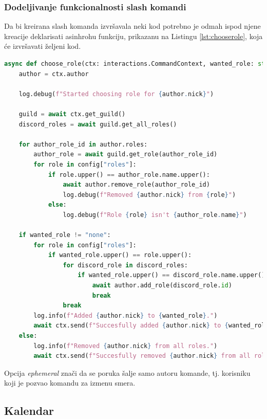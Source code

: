 \documentclass[a4paper,11pt]{article}
\begin{document}
\subsubsection{Dodeljivanje funkcionalnosti slash komandi}
Da bi kreirana slash komanda izvršavala neki kod potrebno je odmah ispod njene kreacije deklarisati asinhrohu funkciju, prikazanu na Listingu \ref{lst:chooserole}, koja će izvršavati željeni kod.
\begin{lstlisting}[language=Python, caption=Dodeljivanje funkcionalnosti slash komandi, label=lst:chooserole]
async def choose_role(ctx: interactions.CommandContext, wanted_role: str):
    author = ctx.author

    log.debug(f"Started choosing role for {author.nick}")

    guild = await ctx.get_guild()
    discord_roles = await guild.get_all_roles()

    for author_role_id in author.roles:
        author_role = await guild.get_role(author_role_id)
        for role in config["roles"]:
            if role.upper() == author_role.name.upper():
                await author.remove_role(author_role_id)
                log.debug(f"Removed {author.nick} from {role}")
            else:
                log.debug(f"Role {role} isn't {author_role.name}")
    
    if wanted_role != "none":
        for role in config["roles"]:
            if wanted_role.upper() == role.upper():
                for discord_role in discord_roles:
                    if wanted_role.upper() == discord_role.name.upper():
                        await author.add_role(discord_role.id)
                        break
                break
        log.info(f"Added {author.nick} to {wanted_role}.")
        await ctx.send(f"Succesfully added {author.nick} to {wanted_role.upper()}!", ephemeral=True)
    else:
        log.info(f"Removed {author.nick} from all roles.")
        await ctx.send(f"Succesfully removed {author.nick} from all roles!", ephemeral=True)
\end{lstlisting}
Opcija \textit{ephemeral} znači da se poruka šalje samo autoru komande, tj. korisniku koji je pozvao komandu za izmenu smera.
\newpage
\subsection{Kalendar}
\end{document}
